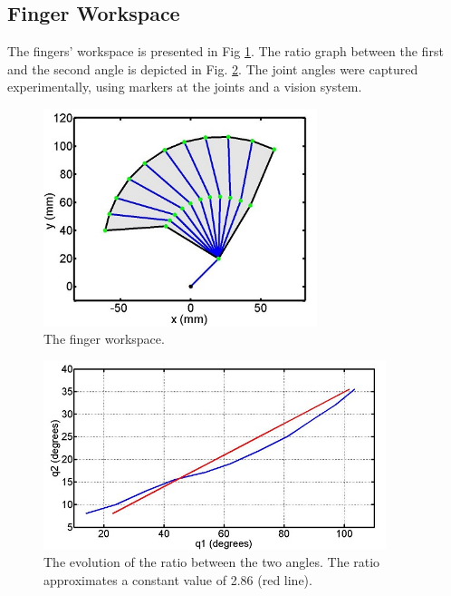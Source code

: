 \vspace{1cm}

\subsection{Finger Workspace}

The fingers' workspace is presented in Fig \ref{workspace}. The ratio graph between the first and the second angle is depicted in Fig. \ref{ratio}. The joint angles were captured experimentally, using markers at the joints and a vision system.

\begin{figure}[h!]
\begin{center}
	\includegraphics[width=8cm]{figures/Intro/Fig1-5-1.jpg}
\end{center}
\caption{ The finger workspace.} 
\label{workspace}
\end{figure}

\begin{figure}[h!]
\begin{center}
	\includegraphics[width=10cm]{figures/Intro/Fig1-5-2.jpg}
\end{center}
\caption{The evolution of the ratio between the two angles. The ratio approximates a constant value of 2.86 (red line).} 
\label{ratio}
\end{figure}

